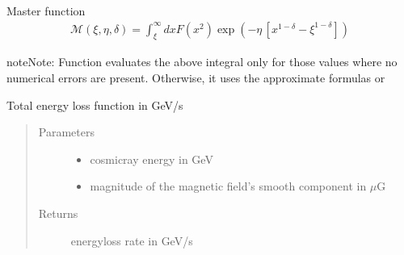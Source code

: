 \documentclass[letterpaper,10pt,english]{sphinxmanual}
\begin{document}

\begin{fulllineitems}
\label{\detokenize{diffsph.spectra:diffsph.spectra.analytics.anltc_Mst}}
\sphinxAtStartPar
Master function
\begin{equation*}
\begin{split}\mathcal M(\xi,\eta,\delta) = \int_\xi^\infty dx F(x^2)\exp\left(-\eta\,[x^{1-\delta}-\xi^{1-\delta}]\right)\end{split}
\end{equation*}
\begin{sphinxadmonition}{note}{Note:}
\sphinxAtStartPar
Function evaluates the above integral only for those values where no numerical errors are present. Otherwise, it uses the approximate formulas {\hyperref[\detokenize{diffsph.spectra:diffsph.spectra.analytics.M_C}]{}} or {\hyperref[\detokenize{diffsph.spectra:diffsph.spectra.analytics.M_i}]{}}
\end{sphinxadmonition}

\end{fulllineitems}


\begin{fulllineitems}
\label{\detokenize{diffsph.spectra:diffsph.spectra.analytics.btot}}
\sphinxAtStartPar
Total energy loss function in GeV/s
\begin{quote}\begin{description}
\item[{Parameters}] \leavevmode\begin{itemize}
\item {} 
\sphinxAtStartPar
{} \textendash{} cosmic\sphinxhyphen{}ray energy in GeV

\item {} 
\sphinxAtStartPar
{} \textendash{} magnitude of the magnetic field’s smooth component in \(\mu\)G

\end{itemize}

\item[{Returns}] \leavevmode
\sphinxAtStartPar
energy\sphinxhyphen{}loss rate in GeV/s

\end{description}\end{quote}

\end{fulllineitems}
\end{document}

